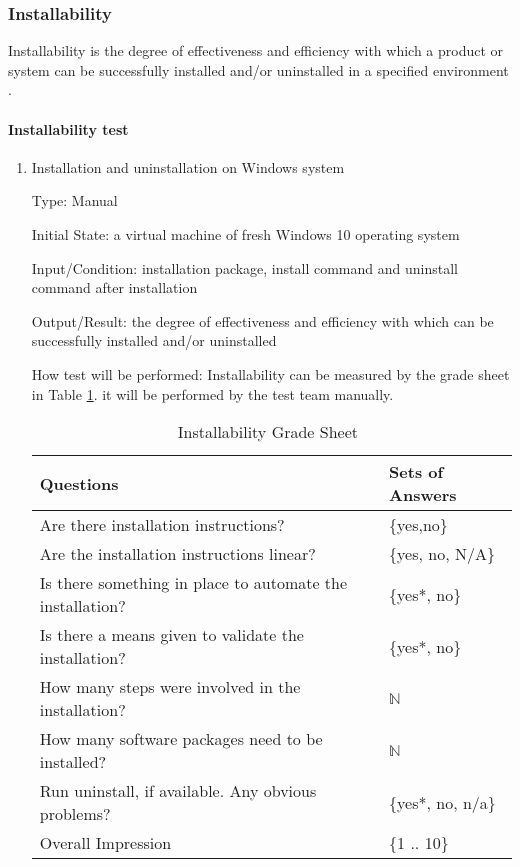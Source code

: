 \documentclass[12pt, titlepage]{article}
\begin{document}
\subsubsection{Installability}
\label{sec_installtest}
	Installability is the degree of effectiveness and efficiency with which a product or system can be successfully installed and/or uninstalled in a specified environment \cite{ISO/IEC25010:2011}.
	
\paragraph{Installability test}

\begin{enumerate}

\item{Installation and uninstallation on Windows system}

Type: Manual
					
Initial State: a virtual machine of fresh Windows 10 operating system
					
Input/Condition: \progname{} installation package, install command and uninstall command after installation
					
Output/Result: the degree of effectiveness and efficiency
with which \progname{} can be successfully installed and/or uninstalled
					
How test will be performed: Installability can be measured by the grade sheet in Table \ref{Tb_install}. it  will  be  performed  by  the  test  team manually.

\begin{table}[h]
\begin{tabular}{@{}ll@{}}
\toprule
Questions & Sets of Answers \\ \midrule
Are there installation instructions? & \{yes,no\} \\
Are the installation instructions linear? & \{yes, no, N/A\} \\
Is there something in place to automate the installation? & \{yes*, no\} \\
Is there a means given to validate the installation? & \{yes*, no\} \\
How many steps were involved in the installation? & $\mathbb{N}$ \\
How many software packages need to be installed? & $\mathbb{N}$ \\
Run uninstall, if available. Any obvious problems? & \{yes*, no, n/a\} \\
Overall Impression & \{1 .. 10\}\\ \bottomrule
\end{tabular}
\caption{Installability Grade Sheet~\cite{SmithEtAl2018}}
\label{Tb_install}
\end{table}


\end{enumerate}
\end{document}
